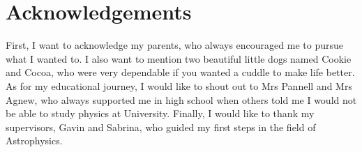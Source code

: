 \chapter{Acknowledgements}

First, I want to acknowledge my parents, who always encouraged me to pursue what I wanted to. I also want to mention two beautiful little dogs named Cookie and Cocoa, who were very dependable if you wanted a cuddle to make life better. As for my educational journey, I would like to shout out to Mrs Pannell and Mrs Agnew, who always supported me in high school when others told me I would not be able to study physics at University. Finally, I would like to thank my supervisors, Gavin and Sabrina, who guided my first steps in the field of Astrophysics.